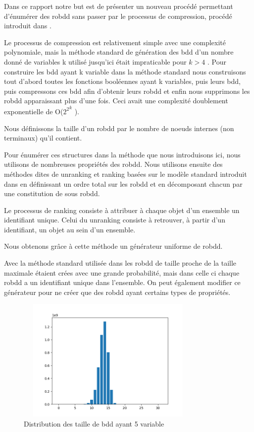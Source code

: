 \documentclass[french]{article}
\begin{document}
Dans ce rapport notre but est de présenter un nouveau procédé permettant d'énumérer des robdd sans passer par le processus de compression, procédé introduit dans \cite{genitrini}.\medskip

Le processus de compression est relativement simple avec une complexité polynomiale, mais la méthode standard de génération des bdd d'un nombre donné de variables k utilisé jusqu'ici était impraticable pour {\(k > 4\)} \cite{newton}. Pour construire les bdd ayant k variable dans la méthode standard nous construisons tout d'abord toutes les fonctions booléennes ayant k variables, puis leurs bdd, puis compressons ces bdd afin d'obtenir leurs robdd et enfin nous supprimons les robdd apparaissant plus d'une fois. Ceci avait une complexité doublement exponentielle de  O(\( {2^2}^k\) ).\medskip

Nous définissons la taille d'un robdd par le nombre de noeuds internes (non terminaux) qu'il contient.

Pour énumérer ces structures dans la méthode que nous introduisons ici, nous utilisons de nombreuses propriétés des robdd.  Nous utilisons ensuite des méthodes dites de unranking et ranking basées sur le modèle standard introduit dans \cite{wilf} en définissant un ordre total sur les robdd et en décomposant chacun par une constitution de sous robdd.

Le processus de ranking consiste à attribuer à chaque objet d'un ensemble un identifiant unique. Celui du unranking consiste à retrouver, à partir d'un identifiant, un objet au sein d'un ensemble.\medskip

Nous obtenons grâce à cette méthode un générateur uniforme de robdd.\medskip

Avec la méthode standard utilisée dans \cite{newton} les robdd de taille proche de la taille maximale étaient crées avec une grande probabilité, mais dans celle ci chaque robdd a un identifiant unique dans l'ensemble. On peut également modifier ce générateur pour ne créer que des robdd ayant certains types de propriétés.

\begin{figure}[htp]
    \centering
    \includegraphics[width=9cm, height=6cm]{index5}
    \caption{Distribution des taille de bdd ayant 5 variable}
    \label{fig:Figure1.2}
\end{figure}
\end{document}
